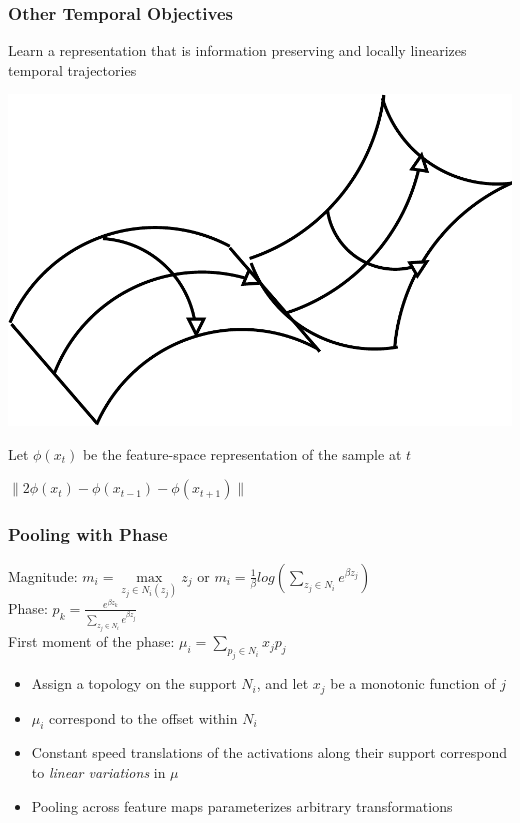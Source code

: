 \documentclass{beamer}
\begin{document}
\begin{frame}
\frametitle{Other Temporal Objectives} 
Learn a representation that is information preserving and locally linearizes temporal trajectories 
\centerline{\includegraphics[scale=0.3]{./images/NewStuff/manifolds.pdf}}
Let $\phi(x_t)$ be the feature-space representation of the sample at $t$ \\
\centerline{$\|2\phi(x_t)-\phi(x_{t-1})-\phi(x_{t+1})\|$}
\end{frame} 

\begin{frame}
\frametitle{Pooling with Phase} 
Magnitude: $m_i = \max\limits_{z_j \in N_i(z_j)} z_j$ \hspace{0.25cm} or \hspace{0.25cm} $m_i = \frac{1}{\beta} log\left( \sum\limits_{z_j \in N_i} e^ {\beta z_j} \right)$ \\
Phase: $p_k = \frac{e^{\beta z_k}}{\sum\limits_{z_j \in N_i} e^{\beta z_j}}$ \\
First moment of the phase: $\mu_i = \sum \limits_{p_j \in N_i} x_j p_j$ \\
\begin{itemize}
\item Assign a topology on the support $N_i$, and let $x_j$ be a monotonic function of $j$
\item $\mu_i$ correspond to the offset within $N_i$
\item Constant speed translations of the activations along their support correspond to \emph{linear variations} in $\mu$
\item Pooling across feature maps parameterizes arbitrary transformations
\end{itemize} 
\end{frame} 
\end{document}
